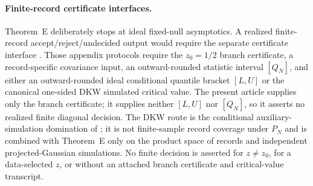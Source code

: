 \paragraph{Finite-record certificate interfaces.}
Theorem~E deliberately stops at ideal fixed-null asymptotics.  A realized
finite-record accept/reject/undecided output would require the separate
certificate interface
.
Those appendix protocols require the \(z_0=1/2\) branch certificate, a
record-specific covariance input, an outward-rounded statistic interval
\([Q_N]\), and either an outward-rounded ideal conditional quantile bracket
\([L,U]\) or the canonical one-sided DKW simulated critical value.  The present
article supplies only the branch certificate; it supplies neither \([L,U]\)
nor \([Q_N]\), so it asserts no realized finite diagonal decision.  The DKW
route is the conditional auxiliary-simulation domination of
; it is not finite-sample
record coverage under \(P_N\) and is combined with Theorem~E only on the
product space of records and independent projected-Gaussian simulations.
No finite decision is asserted for \(z\ne z_0\), for a data-selected \(z\), or
without an attached branch certificate and critical-value transcript.

